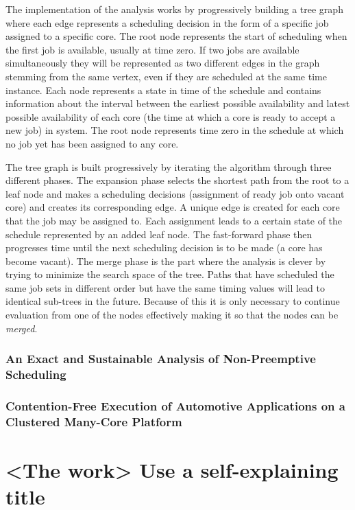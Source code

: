 \documentclass{kththesis}
\begin{document}
The implementation of the analysis works by progressively building a tree graph where each edge
represents a scheduling decision in the form of a specific job assigned to a specific core. The root
node represents the start of scheduling when the first job is available, usually at time zero. 
If two jobs are available simultaneously they will be represented as two different edges in the graph
stemming from the same vertex, even if they are scheduled at the same time instance. Each node
represents a state in time of the schedule and contains information about the interval between the
earliest possible availability and latest possible availability of each core (the time at which a
core is ready to accept a new job) in
system. The root node represents time zero in the schedule at which no job yet has been assigned to
any core. 

The tree graph is built progressively by iterating the algorithm through three different phases.
The expansion phase selects the shortest path from the root to a leaf node and makes a scheduling
decisions (assignment of ready job onto vacant core) and creates its corresponding edge. A unique
edge is created for each core that the job may be assigned to. Each assignment leads to a certain
state of the schedule represented by an added leaf node. The fast-forward phase then progresses 
time until the next scheduling decision is to be made (a core has become vacant). The merge phase is
the part where the analysis is clever by trying to minimize the search space of the tree. Paths that
have scheduled the same job sets in different order but have the same timing values will lead to
identical sub-trees in the future. Because of this it is only necessary to continue evaluation from
one of the nodes effectively making it so that the nodes can be \textit{merged}.


\subsection{An Exact and Sustainable Analysis of Non-Preemptive Scheduling}


\subsection{Contention-Free Execution of Automotive Applications on a Clustered Many-Core Platform}



\chapter{<The work> Use a self-explaining title}
\end{document}

